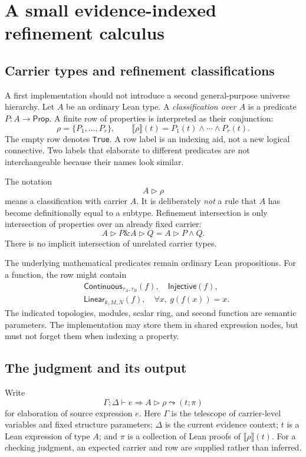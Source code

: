 \documentclass[11pt,letterpaper]{article}
\newcommand{\code}[1]{\nolinkurl{#1}}
\newcommand{\Prop}{\mathsf{Prop}}
\newcommand{\den}[1]{\llbracket #1\rrbracket}
\newcommand{\view}[2]{#1\mathbin{\triangleright}#2}
\theoremstyle{definition}
\theoremstyle{remark}
\begin{document}
\section{A small evidence-indexed refinement calculus}\label{sec:calculus}

\subsection{Carrier types and refinement classifications}
A first implementation should not introduce a second general-purpose universe
hierarchy. Let $A$ be an ordinary Lean type. A \emph{classification over $A$} is a
predicate $P:A\to\Prop$. A finite row of properties is interpreted as their
conjunction:
\[
\rho=\{P_1,\ldots,P_r\},\qquad
\den{\rho}(t)=P_1(t)\land\cdots\land P_r(t).
\]
The empty row denotes \code{True}. A row label is an indexing aid, not a new
logical connective. Two labels that elaborate to different predicates are not
interchangeable because their names look similar.

The notation
\[
\view{A}{\rho}
\]
means a classification with carrier $A$. It is deliberately \emph{not} a rule that
$A$ has become definitionally equal to a subtype. Refinement intersection is only
intersection of properties over an already fixed carrier:
\[
\view{A}{P}\mathbin{\&}\view{A}{Q}
=\view{A}{P\land Q}.
\]
There is no implicit intersection of unrelated carrier types.

The underlying mathematical predicates remain ordinary Lean propositions. For a
function, the row might contain
\[
\begin{split}
&\mathsf{Continuous}_{\tau_A,\tau_B}(f),\quad
\mathsf{Injective}(f),\\
&\mathsf{Linear}_{k,M,N}(f),\quad
\forall x,\ g(f(x))=x.
\end{split}
\]
The indicated topologies, modules, scalar ring, and second function are semantic
parameters. The implementation may store them in shared expression nodes, but
must not forget them when indexing a property.

\subsection{The judgment and its output}
Write
\[
\Gamma;\Delta\vdash e\Rightarrow\view{A}{\rho}
\leadsto(t;\pi)
\tag{J}
\]
for elaboration of source expression $e$. Here $\Gamma$ is the telescope of
carrier-level variables and fixed structure parameters; $\Delta$ is the current
evidence context; $t$ is a Lean expression of type $A$; and $\pi$ is a collection
of Lean proofs of $\den{\rho}(t)$. For a checking judgment, an expected carrier and
row are supplied rather than inferred.
\end{document}
